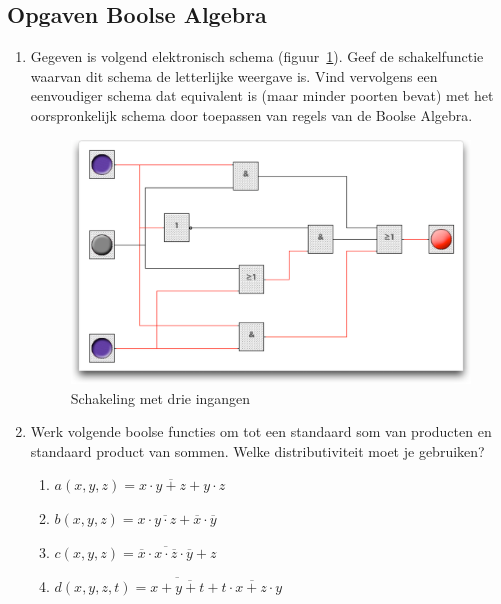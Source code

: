 \subsection{Opgaven Boolse Algebra}

\begin{enumerate}
\item Gegeven is volgend elektronisch schema (figuur~\ref{fig:schema1}). Geef de schakelfunctie waarvan dit schema de letterlijke weergave is. Vind vervolgens een eenvoudiger schema dat equivalent is (maar minder poorten bevat) met het oorspronkelijk schema door toepassen van regels van de Boolse Algebra.
\begin{figure}[htbp]
\begin{center}
\includegraphics[width=\textwidth]{figuren/boole/el_schema1.pdf}
\caption{Schakeling met drie ingangen}
\label{fig:schema1}
\end{center}
\end{figure}
\item Werk volgende boolse functies om tot een standaard som van producten en standaard product van sommen. Welke distributiviteit moet je gebruiken?
\begin{enumerate}
\item $a(x,y,z)=x\cdot \overline{y+z} + y\cdot z$
\item $b(x,y,z)=x\cdot \overline{y\cdot z} + \overline{x}\cdot \overline{y}$
\item $c(x,y,z)=\overline{x}\cdot \overline{x\cdot \overline{z}}\cdot \overline{y} + z$
\item $d(x,y,z,t)=\overline{x+\overline{y+t}} + \overline{t\cdot x+z\cdot y}$
\end{enumerate}


\end{enumerate}
